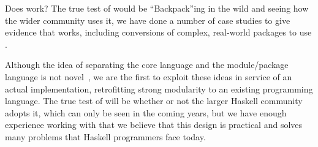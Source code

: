 \begin{itemize}
    Does \Backpack{} work?
    The true test of \Backpack{} would be
    ``Backpack''ing in the wild and seeing how the wider community
    uses it, we have done a number of case studies to give evidence
    that \Backpack{} works, including conversions of complex,
    real-world packages to use \Backpack{}.


\end{itemize}
%
Although the idea of separating the core language and the module/package
language is not novel~\cite{leroy:modular,milner+:def-of-sml-revised,rossberg+:f-ing}, we are the first to exploit these ideas in service
of an actual implementation, retrofitting strong modularity to an existing
programming language.  The true test of \Backpack{} will be whether or not
the larger Haskell community adopts it, which can only be seen in the
coming years, but we have enough experience working with \Backpack{}
that we believe that this design is practical and solves many problems
that Haskell programmers face today.




